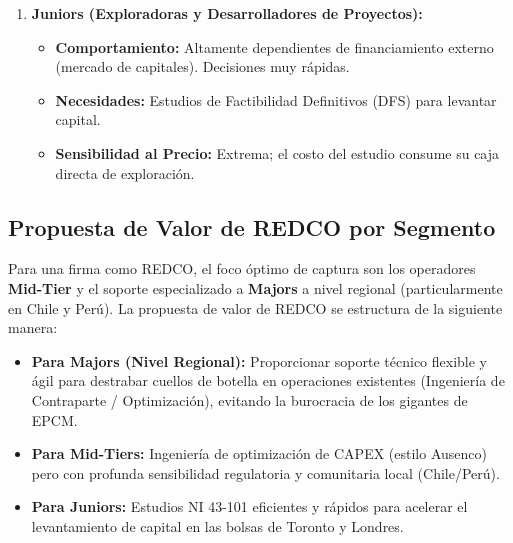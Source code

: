 \begin{enumerate}
    \item \textbf{Juniors (Exploradoras y Desarrolladores de Proyectos):}
    \begin{itemize}
        \item \textbf{Comportamiento:} Altamente dependientes de financiamiento externo (mercado de capitales). Decisiones muy rápidas.
        \item \textbf{Necesidades:} Estudios de Factibilidad Definitivos (DFS) para levantar capital.
        \item \textbf{Sensibilidad al Precio:} Extrema; el costo del estudio consume su caja directa de exploración.
    \end{itemize}
\end{enumerate}

\subsection{Propuesta de Valor de REDCO por Segmento}
Para una firma como REDCO, el foco óptimo de captura son los operadores \textbf{Mid-Tier} y el soporte especializado a \textbf{Majors} a nivel regional (particularmente en Chile y Perú). La propuesta de valor de REDCO se estructura de la siguiente manera:

\begin{marketdatabox}
\begin{itemize}[leftmargin=*]
    \item \textbf{Para Majors (Nivel Regional):} Proporcionar soporte técnico flexible y ágil para destrabar cuellos de botella en operaciones existentes (Ingeniería de Contraparte / Optimización), evitando la burocracia de los gigantes de EPCM.
    \item \textbf{Para Mid-Tiers:} Ingeniería de optimización de CAPEX (estilo Ausenco) pero con profunda sensibilidad regulatoria y comunitaria local (Chile/Perú).
    \item \textbf{Para Juniors:} Estudios NI 43-101 eficientes y rápidos para acelerar el levantamiento de capital en las bolsas de Toronto y Londres.
\end{itemize}
\end{marketdatabox}
